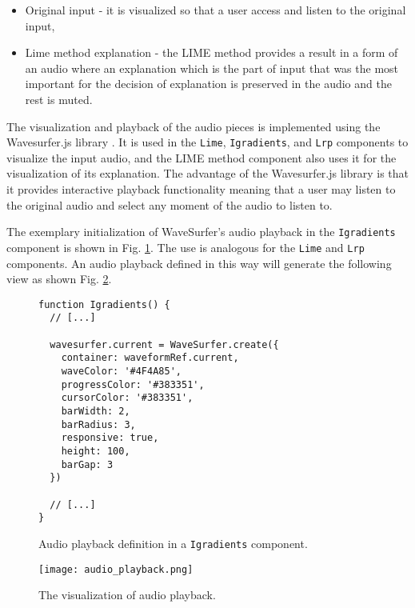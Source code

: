 \documentclass[
    bindingoffset=5mm,  %
    footnoteindent=3mm, %
    hyphenation=true    %
]{src/wut-thesis}
\begin{document}
\begin{itemize}
    \item Original input - it is visualized so that a user access and listen
          to the original input,
    \item Lime method explanation - the LIME method provides a result in a form of an audio
          where an explanation which is the part of input that was the most important for
          the decision of explanation is preserved in the audio and the rest is muted.
\end{itemize}

The visualization and playback of the audio pieces is implemented using the Wavesurfer.js
library \cite{WavesurferDOC}. It is used in the \texttt{Lime}, \texttt{Igradients}, and \texttt{Lrp}
components to visualize the input audio, and the LIME method component also uses it for the
visualization of its explanation. The advantage of the Wavesurfer.js library is that it
provides interactive playback functionality meaning that a user may listen to the original
audio and select any moment of the audio to listen to.

The exemplary initialization of WaveSurfer's audio playback in the \texttt{Igradients} component is shown
in Fig. \ref{fig:IgradientsAudioPlayback}. The use is analogous for the \texttt{Lime} and \texttt{Lrp} components.
An audio playback defined in this way will generate the following view as shown Fig. \ref{fig:AudioPlayback}.

\begin{figure}%
\begin{verbatim}
function Igradients() {
  // [...]

  wavesurfer.current = WaveSurfer.create({
    container: waveformRef.current,
    waveColor: '#4F4A85',
    progressColor: '#383351',
    cursorColor: '#383351',
    barWidth: 2,
    barRadius: 3,
    responsive: true,
    height: 100,
    barGap: 3
  })

  // [...]
}
\end{verbatim}
\caption{Audio playback definition in a \texttt{Igradients} component.}
\label{fig:IgradientsAudioPlayback}
\end{figure}

\begin{figure}[h!] %
    \centering
    \texttt{[image: audio\_playback.png]}
    \caption{The visualization of audio playback.}
    \label{fig:AudioPlayback}
\end{figure}
\end{document}
